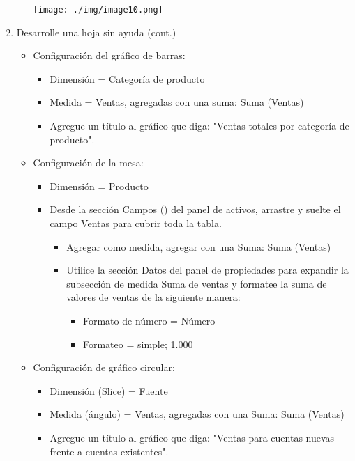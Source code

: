 \documentclass[12pt,letterpaper]{article}
\begin{document}
\begin{enumerate}
\begin{itemize}
        \begin{center}
            \texttt{[image: ./img/image10.png]} 
        \end{center}
    \end{itemize}
    \item Desarrolle una hoja sin ayuda (cont.)
    \begin{itemize}
        \item Configuración del gráfico de barras:
        \begin{itemize}
            \item Dimensión = Categoría de producto
            \item Medida = Ventas, agregadas con una suma: Suma (Ventas)
            \item Agregue un título al gráfico que diga: "Ventas totales por categoría de producto".
        \end{itemize}
        \item Configuración de la mesa:
        \begin{itemize}
            \item Dimensión = Producto
            \item Desde la sección Campos () del panel de activos, arrastre y suelte el campo Ventas para cubrir toda la tabla.
            \begin{itemize}
                \item Agregar como medida, agregar con una Suma: Suma (Ventas)
                \item Utilice la sección Datos del panel de propiedades para expandir la subsección de medida Suma de ventas y formatee la suma de valores de ventas de la siguiente manera:
                \begin{itemize}
                    \item Formato de número = Número
                    \item Formateo = simple; 1.000
                \end{itemize}
            \end{itemize}
        \end{itemize}
        \item Configuración de gráfico circular:
        \begin{itemize}
            \item Dimensión (Slice) = Fuente
            \item Medida (ángulo) = Ventas, agregadas con una Suma: Suma (Ventas)
            \item Agregue un título al gráfico que diga: "Ventas para cuentas nuevas frente a cuentas existentes".

\end{itemize}
\end{itemize}
\end{enumerate}
\end{document}
